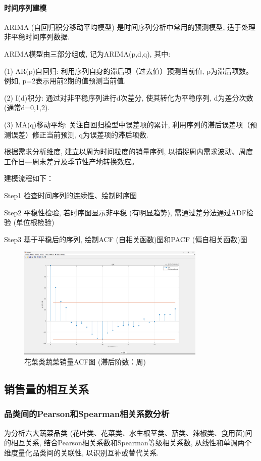 \documentclass{MathNoteCN}
\begin{document}
\paragraph{时间序列建模}
ARIMA (自回归积分移动平均模型) 是时间序列分析中常用的预测模型, 适于处理非平稳时间序列数据. 

ARIMA模型由三部分组成, 记为ARIMA(p,d,q), 其中: 


(1) AR(p)自回归: 利用序列自身的滞后项（过去值）预测当前值, p为滞后项数。例如, p=2表示用前2期的值预测当前值. 

(2) I(d)积分: 通过对非平稳序列进行d次差分, 使其转化为平稳序列, d为差分次数 (通常d=0,1,2). 

(3) MA(q)移动平均: 关注自回归模型中误差项的累计, 利用序列的滞后误差项（预测误差）修正当前预测, q为误差项的滞后项数. 

根据需求分析维度, 建立以周为时间粒度的销量序列, 以捕捉周内需求波动、周度工作日—周末差异及季节性产地转换效应。  

建模流程如下：  


Step1 检查时间序列的连续性、绘制时序图  

Step2 平稳性检验, 若时序图显示非平稳 (有明显趋势), 需通过差分法通过ADF检验 (单位根检验)  

Step3 基于平稳后的序列, 绘制ACF (自相关函数)图和PACF (偏自相关函数)图  

\begin{figure}[H]
    \centering
    \includegraphics[width=0.8\textwidth]{花菜ACF图.png} 
    \caption{花菜类蔬菜销量ACF图 (滞后阶数：周)}
\end{figure}

\subsection{销售量的相互关系}

\subsubsection{品类间的Pearson和Spearman相关系数分析}
为分析六大蔬菜品类 (花叶类、花菜类、水生根茎类、茄类、辣椒类、食用菌)间的相互关系, 结合Pearson相关系数和Spearman等级相关系数, 从线性和单调两个维度量化品类间的关联性, 以识别互补或替代关系. 
\end{document}
